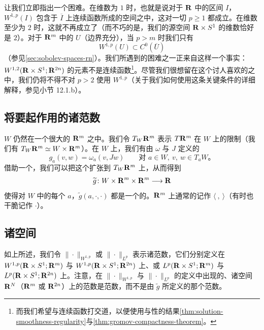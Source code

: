 让我们立即指出一个困难。在维数为 $1$ 时，也就是说对于 $\mathbf{R}$ 中的\trBounded{}区间 $I$，$W^{1,p}(I)$ 包含于 $\overline{I}$ 上连续函数所成的空间之中，这对一切 $p\ge1$ 都成立。在维数至少为 $2$ 时，这就不再成立了（而不巧的是，我们的源空间 $\mathbf{R}\times S^{1}$ 的维数恰好是 $2$）。对于 $\mathbf{R}^{m}$ 中\trBounded{}的 $U$（边界充分\trRegular），当 $p>m$ 时我们只有
\[
W^{1,p}(U)\subset C^{0}(\overline{U})
\]
（参见\cref{sec:sobolev-spaces-rn}）。我们所遇到的困难之一正来自这样一个事实：$W^{1,2}(\mathbf{R}\times S^{1};\mathbf{R}^{2n})$ 的元素不是连续函数\footnote{而我们希望与连续函数打交道，以便使用\trRegularity{}与\trCompact{}性的结果\cref{thm:solution-smoothness-regularity}与\cref{thm:gromov-compactness-theorem}。}。尽管我们很想留在这个讨人喜欢的\trHilbertSpace{}之中，我们仍将不得不对 $p>2$ 使用 $W^{1,p}$（关于我们如何使用这条关键条件的详细解释，参见小节 12.1.b）。

\subsection{将要起作用的诸范数}
\label{subsec:norms-role}

\trSymplectic{}\trManifold{} $W$ 仍然\trEmbedding{}在一个很大的 $\mathbf{R}^{m}$ 之中。我们令 $T_{W}\mathbf{R}^{m}$ 表示\trTangentBundle{} $T\mathbf{R}^{m}$ 在 $W$ 上的限制（我们有 $T_{W}\mathbf{R}^{m}\simeq W\times\mathbf{R}^{m}$）。在 $W$ 上，我们有由 $\omega$ 与 $J$ 定义的\trRiemannian{}\trMetric
\[
g_{a}(v,w)=\omega_{a}(v,Jw)\qquad\text{对 }a\in W,\ v,\ w\in T_{a}W\text{。}
\]
借助一个\trPartitionOfUnity，我们可以把这个\trMetric{}扩张到 $T_{W}\mathbf{R}^{m}$ 上，从而得到
\[
\widetilde{g}\colon W\times\mathbf{R}^{m}\times\mathbf{R}^{m}\longrightarrow\mathbf{R}
\]
使得对 $W$ 中的每个 $a$，$\widetilde{g}(a,\cdot,\cdot)$ 都是一个\trPositiveDefinite{}的\trSymmetricBilinearForm。$\mathbf{R}^{m}$ 上通常的\trInnerProduct{}记作 $\langle\ ,\ \rangle$（有时也干脆记作 $\cdot$）。

\subsection{\trTrajectory{}诸空间}
\label{subsec:trajectory-spaces}

如上所述，我们令 $\|\cdot\|_{W^{1,p}}$ 或 $\|\cdot\|_{L^{p}}$ 表示诸\trSobolev{}范数，它们分别定义在 $W^{1,p}(\mathbf{R}\times S^{1};\mathbf{R}^{m})$ 与 $W^{1,p}(\mathbf{R}\times S^{1};\mathbf{R}^{2n})$ 上、或 $L^{p}(\mathbf{R}\times S^{1};\mathbf{R}^{m})$ 与 $L^{p}(\mathbf{R}\times S^{1};\mathbf{R}^{2n})$ 上。注意，在 $\|\cdot\|_{W^{1,p}}$ 与 $\|\cdot\|_{L^{p}}$ 的定义中出现的、诸空间 $\mathbf{R}^{N}$（$\mathbf{R}^{m}$ 或 $\mathbf{R}^{2n}$）上的范数是\trEuclidean{}范数，而不是由 $\widetilde{g}$ 所定义的那个范数。

